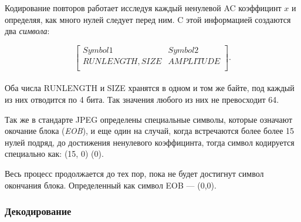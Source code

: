 \documentclass{matmex-diploma-custom}
\begin{document}
Кодирование повторов работает исследуя каждый  ненулевой AC коэффицинт $x$ и определяя, как много нулей следует перед ним. C этой информацией создаются два \emph{символа}:


  $$ \begin{bmatrix}
        Symbol 1 & Symbol 2 \\
        RUNLENGTH, SIZE& AMPLITUDE\\

       \end{bmatrix}. $$\\

  Оба числа RUNLENGTH и SIZE  хранятся в одном и том же байте, под каждый из них отводится по 4 бита. Так значения любого из них не превосходит 64.


Так же в стандарте JPEG определены специальные символы, которые означают окочание блока (\emph{EOB}), и еще один на случай, когда встречаются более более 15 нулей подряд, до достижения ненулевого коэффицинта, тогда символ кодируется специально как: (15, 0) (0).

 Весь процесс продолжается до тех пор, пока не будет достигнут символ окончания блока. Определенный как символ  EOB --- (0,0).\\



\subsubsection{Декодирование}
\end{document}
